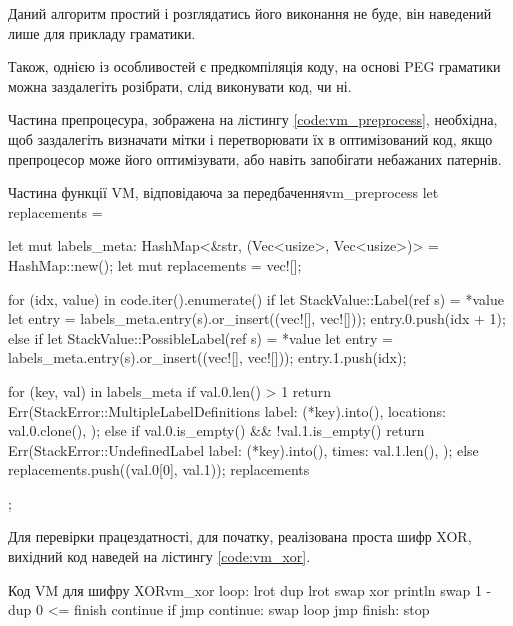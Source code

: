 \documentclass{lib/styles/default-style}
\begin{document}
    Даний алгоритм простий і розглядатись його виконання не буде, він наведений лише для прикладу граматики.
    
    Також, однією із особливостей є предкомпіляція коду, на основі PEG граматики можна заздалегіть розібрати, слід виконувати код, чи ні.

    Частина препроцесура, зображена на лістингу \ref{code:vm_preprocess}, необхідна, щоб заздалегіть визначати мітки і перетворювати
    їх в оптимізований код, якщо препроцесор може його оптимізувати, або навіть запобігати небажаних патернів.

    \begin{code}{Частина функції VM, відповідаюча за передбачення}{vm_preprocess}        
        let replacements = {
            let mut labels_meta: HashMap<&str, (Vec<usize>, Vec<usize>)> = HashMap::new();
            let mut replacements = vec![];

            for (idx, value) in code.iter().enumerate() {
                if let StackValue::Label(ref s) = *value {
                    let entry = labels_meta.entry(s).or_insert((vec![], vec![]));
                    entry.0.push(idx + 1);
                } else if let StackValue::PossibleLabel(ref s) = *value {
                    let entry = labels_meta.entry(s).or_insert((vec![], vec![]));
                    entry.1.push(idx);
                }
            }

            for (key, val) in labels_meta {
                if val.0.len() > 1 {
                    return Err(StackError::MultipleLabelDefinitions {
                        label: (*key).into(),
                        locations: val.0.clone(),
                    });
                } else if val.0.is_empty() && !val.1.is_empty() {
                    return Err(StackError::UndefinedLabel {
                        label: (*key).into(),
                        times: val.1.len(),
                    });
                } else {
                    replacements.push((val.0[0], val.1));
                }
            }
            replacements
        };\end{code}
    
    
    Для перевірки працездатності, для початку, реалізована проста шифр XOR, вихідний код наведей на лістингу \ref{code:vm_xor}.

    \begin{code}{Код VM для шифру XOR}{vm_xor}
        loop:
        lrot
        dup
        lrot
        swap
        xor
        println
        swap
        1 - 
        dup
        0
        <= finish continue if jmp
    continue:
        swap
        loop jmp
    finish:
        stop\end{code}
    
\end{document}
